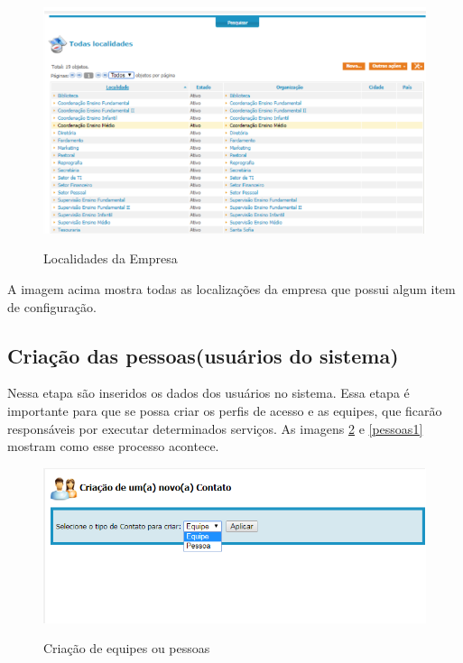 \documentclass[eso]{bcc}
\begin{document}
\begin{figure}[!h]
\centering
\caption[Localidades da empresa]{Localidades da Empresa}
\includegraphics[scale=0.9]{Figuras/itop1.png}
\label{localidades}
\end{figure}
A imagem acima mostra todas as localizações da empresa que possui algum item de configuração.



\subsection{Criação das pessoas(usuários do sistema)}
Nessa etapa são inseridos os dados dos usuários no sistema. Essa etapa é importante para que se possa criar os perfis de acesso e as equipes, que ficarão responsáveis por executar determinados serviços. As imagens \ref{pessoas} e \ref{pessoas1} mostram como esse processo acontece.
\newpage

\begin{figure}[!h]
\centering
\caption[Criação de equipes ou pessoas]{Criação de equipes ou pessoas}
\includegraphics[scale=0.9]{Figuras/criacaodepessoas.png}
\label{pessoas}
\end{figure}


\newpage
\end{document}
